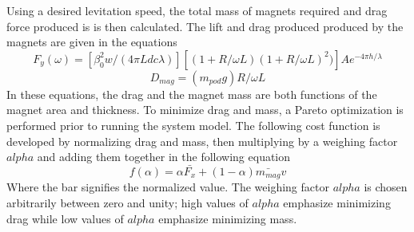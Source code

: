 	Using a desired levitation speed, the total mass of magnets required and drag force produced is is then calculated. The lift and drag produced produced by the magnets are given in the equations
	\begin{equation}
		\label{eq:fy_lev}
		F_{y}(\omega)=[\beta _{0}^{2}w/(4\pi Ldc\lambda )][( 1+R/\omega L)(1+R/\omega L)^{2})]Ae^{-4\pi h/\lambda }
	\end{equation}
	\begin{equation}
		\label{eq:dmag}
		D_{mag}=( m_{pod}g)R/\omega L
	\end{equation}
	In these equations, the drag and the magnet mass are both functions of the magnet area and thickness. To minimize drag and mass, a Pareto optimization is performed prior to running the system model. The following cost function is developed by normalizing drag and mass, then multiplying by a weighing factor $alpha$ and adding them together in the following equation
	\begin{equation}
		\label{eq:pareto}
		f(\alpha ) = \alpha \bar{F_{x}} + (1-\alpha )\bar{m_{mag}}v
	\end{equation}
	Where the bar signifies the normalized value. The weighing factor $alpha$ is chosen arbitrarily between zero and unity; high values of $alpha$ emphasize minimizing drag while low values of $alpha$ emphasize minimizing mass.




